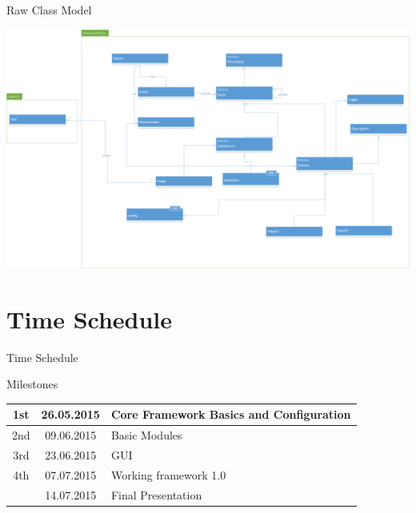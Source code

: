 \documentclass{beamer}
\newcommand{\beginbackup}{
   \newcounter{framenumbervorappendix}
   \setcounter{framenumbervorappendix}{\value{framenumber}}
}
\newcommand{\backupend}{
   \addtocounter{framenumbervorappendix}{-\value{framenumber}}
   \addtocounter{framenumber}{\value{framenumbervorappendix}}
}
\begin{document}
\begin{frame}{Raw Class Model}

	\includegraphics[width=\textwidth]{Model_raw.png}
\end{frame}

\section{Time Schedule}
\begin{frame}{Time Schedule}

	{\Huge Milestones}
	\vspace{1cm}


	\Large
	\begin{tabular}{|c|c|p{5cm}|}
		\hline
		1st	&	26.05.2015	&	Core Framework Basics and Configuration \\ \hline
		2nd	&	09.06.2015	&	Basic Modules \\ \hline
		3rd	&	23.06.2015	&	GUI \\ \hline
		4th	&	07.07.2015	&	Working framework 1.0 \\ \hline
			&	14.07.2015	&	Final Presentation	\\ \hline
	\end{tabular}

\end{frame}








\end{document}
